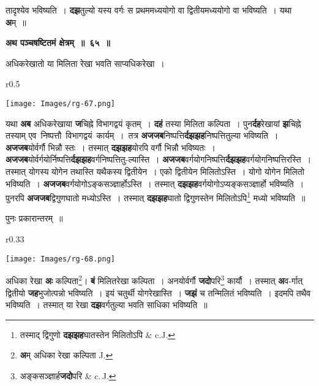 \documentclass[11pt, openany]{book}
\begin{document}
\newpage
\noindent तादृश्येव भविष्यति~। \textbf{दझ}तुल्यो यस्य वर्गः स प्रथममध्ययोगो वा द्वितीयमध्ययोगो वा भविष्यति~। यथा \textbf{अ}म्~॥
\vspace{2mm}

\begin{center}
\textbf{\large अथ पञ्चषष्टितमं क्षेत्रम्~॥~६५~॥}
\end{center}

{\ab  अधिकरेखातो या मिलिता रेखा भवति साप्यधिकरेखा~। }\\

\begin{wrapfigure}{r}{0.5\textwidth}
\vspace{-10mm}
\begin{flushright}
\texttt{[image: Images/rg-67.png]}
\end{flushright}
\vspace{-8mm}
\end{wrapfigure}

यथा \;\textbf{अब} \;अधिकरेखाया \;\textbf{ज}चिह्ने विभागद्वयं कृतम्~। \textbf{दहं} तस्या मिलिता कल्पिता~। पुन\textbf{र्दह}रेखायां \textbf{झ}चिह्ने तस्याम् एव \,निष्पत्तौ \,विभागद्वयं \,कार्यम्~। \,तत्र \textbf{अजजब}निष्पत्ति\textbf{र्दझझह}निष्पत्तितुल्या भविष्यति~। \textbf{अजजब}योर्वर्गौ भिन्नौ स्तः~। तस्मात् \textbf{दझझह}योरपि वर्गौ भिन्नौ भविष्यतः~। \textbf{अजजब}योर्वर्गयोर्निष्पत्ति\textbf{र्दझझह}वर्गनिष्पत्तितु-ल्यास्ति~। \textbf{अजजब}वर्गयोगनिष्पत्ति\textbf{र्दझझह}वर्गयोगनिष्पत्तिरस्ति~। तस्मात् योगस्य योगेन तथास्ति यथैकस्य द्वितीयेन~। एको द्वितीयेन मिलितोऽस्ति~। योगो योगेन मिलितो भविष्यति~। \textbf{अजजब}वर्गयोगोऽङ्कसञ्ज्ञार्होऽस्ति~। तस्मात् \textbf{दझझह}वर्गयोगोऽप्यङ्कसञ्ज्ञार्हो भविष्यति~। पुनरपि \textbf{अजजब}द्विगुणघातो मध्योऽस्ति~। तस्मात् \textbf{दझझह}घातो द्विगुणस्तेन मिलितोऽपि\renewcommand{\thefootnote}{१}\footnote{तस्माद् द्विगुणो \textbf{दझझह}घातस्तेन मिलितोऽपि {\en \& c.\;J.}} मध्यो भविष्यति~॥

\begin{center}
पुनः प्रकारान्तरम्~॥
\end{center}

\begin{wrapfigure}{r}{0.33\textwidth}
\vspace{-10mm}
\begin{center}
\texttt{[image: Images/rg-68.png]}
\end{center}
\vspace{-8mm}
\end{wrapfigure}

अधिका \;रेखा \;\textbf{अः} \;कल्पिता\renewcommand{\thefootnote}{२}\footnote{\textbf{अ}म् अधिका रेखा कल्पिता {\en J.}}\;। \;\textbf{बं} \;मिलितरेखा कल्पिता~। अनयोर्वर्गौ \textbf{जदो}परि\renewcommand{\thefootnote}{३}\footnote{अङ्कसञ्ज्ञार्ह\textbf{जदो}परि {\en \& c.\,J.}} कार्यौ~। तस्मात् \textbf{अ}व-र्गात् द्वितीयो \textbf{जह}भुजोत्पन्नो भविष्यति~। इयं चतुर्थी योगरेखास्ति~। \textbf{जझं} च तन्मिलितं भविष्यति~। इदमपि तथैव भविष्यति~। तस्मात् या रेखा \textbf{दझ}वर्गतुल्या भवति साधिका भविष्यति~॥
\end{document}
